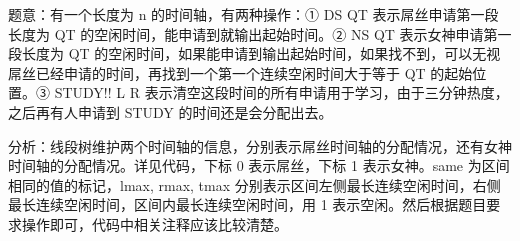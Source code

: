 题意：有一个长度为 n 的时间轴，有两种操作：① DS QT 表示屌丝申请第一段长度为 QT 的空闲时间，能申请到就输出起始时间。② NS QT 表示女神申请第一段长度为 QT 的空闲时间，如果能申请到输出起始时间，如果找不到，可以无视屌丝已经申请的时间，再找到一个第一个连续空闲时间大于等于 QT 的起始位置。③ STUDY!! L R 表示清空这段时间的所有申请用于学习，由于三分钟热度，之后再有人申请到 STUDY 的时间还是会分配出去。

分析：线段树维护两个时间轴的信息，分别表示屌丝时间轴的分配情况，还有女神时间轴的分配情况。详见代码，下标 0 表示屌丝，下标 1 表示女神。same 为区间相同的值的标记，lmax, rmax, tmax 分别表示区间左侧最长连续空闲时间，右侧最长连续空闲时间，区间内最长连续空闲时间，用 1 表示空闲。然后根据题目要求操作即可，代码中相关注释应该比较清楚。